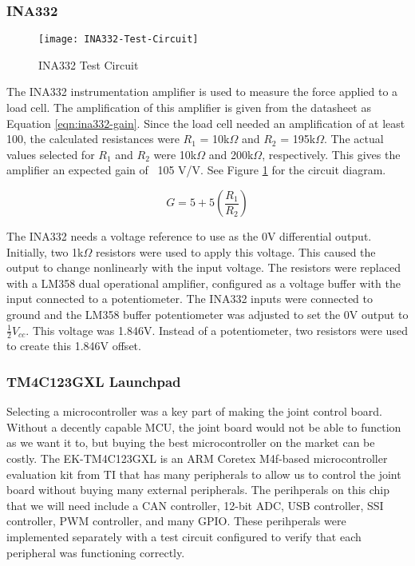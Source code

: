 \subsubsection{INA332}
\label{sec:meth-ina332}

\begin{figure}[H]
	\centering
	\texttt{[image: INA332-Test-Circuit]}
	\caption{INA332 Test Circuit}
	\label{fig:INA332_Test_Circuit}
\end{figure}

\noindent The INA332 instrumentation amplifier is used to measure the force applied to a load cell. The amplification of this amplifier is given from the datasheet as Equation \ref{eqn:ina332-gain}. Since the load cell needed an amplification of at least 100, the calculated resistances were $R_1$ = 10k$\Omega$ and $R_2$ = 195k$\Omega$. The actual values selected for $R_1$ and $R_2$ were 10k$\Omega$ and 200k$\Omega$, respectively. This gives the amplifier an expected gain of ~105 V/V. See Figure \ref{fig:INA332_Test_Circuit} for the circuit diagram.

\begin{equation}
G = 5 + 5(\frac{R_1}{R_2})
\label{eqn:ina332-gain}
\end{equation}

\noindent The INA332 needs a voltage reference to use as the 0V differential output. Initially, two 1k$\Omega$ resistors were used to apply this voltage. This caused the output to change nonlinearly with the input voltage. The resistors were replaced with a LM358 dual operational amplifier, configured as a voltage buffer with the input connected to a potentiometer. The INA332 inputs were connected to ground and the LM358 buffer potentiometer was adjusted to set the 0V output to  $\frac{1}{2} V_{cc}$. This voltage was 1.846V. Instead of a potentiometer, two resistors were used to create this 1.846V offset.

\subsubsection{TM4C123GXL Launchpad}
Selecting a microcontroller was a key part of making the joint control board. Without a decently capable MCU, the joint board would not be able to function as we want it to, but buying the best microcontroller on the market can be costly. The EK-TM4C123GXL is an ARM Coretex M4f-based microcontroller evaluation kit from TI that has many peripherals to allow us to control the joint board without buying many external peripherals. The perihperals on this chip that we will need include a CAN controller, 12-bit ADC, USB controller, SSI controller, PWM controller, and many GPIO. These perihperals were implemented separately with a test circuit configured to verify that each peripheral was functioning correctly.

